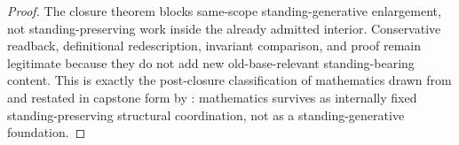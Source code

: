 \begin{proof}
The closure theorem blocks same-scope standing-generative enlargement, not standing-preserving work inside the already admitted interior. Conservative readback, definitional redescription, invariant comparison, and proof remain legitimate because they do not add new old-base-relevant standing-bearing content. This is exactly the post-closure classification of mathematics drawn from \clausuradoc{} and restated in capstone form by \eademdoc{}: mathematics survives as internally fixed standing-preserving structural coordination, not as a standing-generative foundation.
\end{proof}

